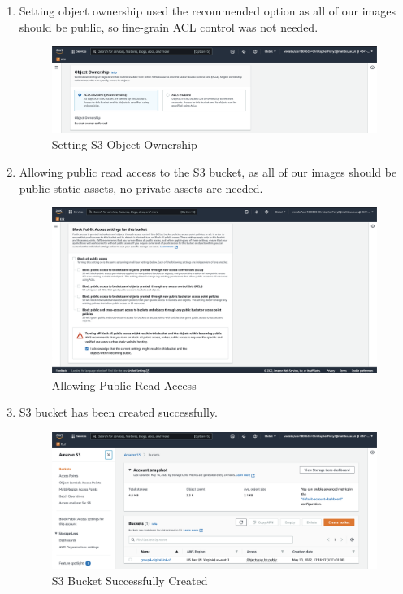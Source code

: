 \begin{enumerate}
    \item Setting object ownership used the recommended option as all of our images should be public, so fine-grain ACL control was not needed.\nolinebreak
        \begin{figure}[H]
            \centering
            \includegraphics[width=\textwidth]{resources/s3/s3-object-ownership.png}
            \caption{Setting S3 Object Ownership}
            \label{fig:s3-object-ownership}
        \end{figure}


    \item Allowing public read access to the S3 bucket, as all of our images should be public static assets, no private assets are needed.\nolinebreak
        \begin{figure}[H]
            \centering
            \includegraphics[width=\textwidth]{resources/s3/s3-public-access.png}
            \caption{Allowing Public Read Access}
            \label{fig:s3-public-access}
        \end{figure}


    \item S3 bucket has been created successfully.\nolinebreak
        \begin{figure}[H]
            \centering
            \includegraphics[width=\textwidth]{resources/s3/s3-created.png}
            \caption{S3 Bucket Successfully Created}
            \label{fig:s3-created}
        \end{figure}



\end{enumerate}
